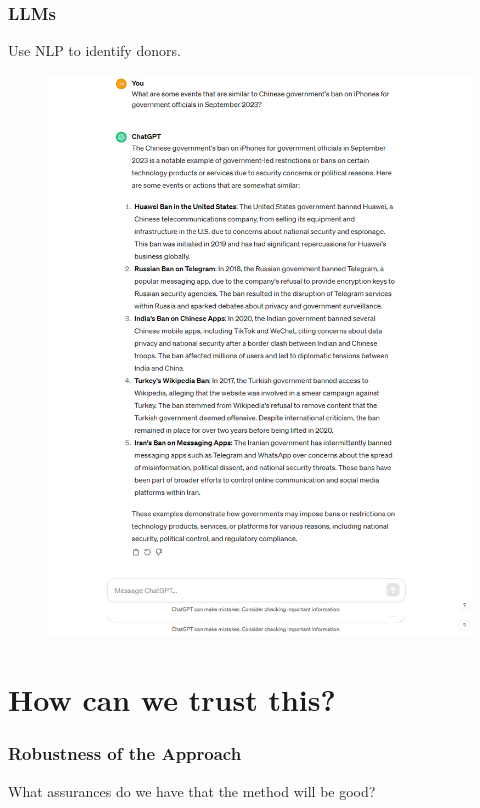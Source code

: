\documentclass[9pt]{beamer}
\theoremstyle{definition}
\begin{document}
\begin{frame}\frametitle{LLMs}
    Use NLP to identify donors.

    \begin{figure}[H]
        \begin{center}
          \includegraphics[scale=.18]{iphone.png}
          \end{center}
        \end{figure}


     
\end{frame}

\section{How can we trust this?}

\begin{frame}\frametitle{Robustness of the Approach}
    What assurances do we have that the method will be good?

    \bigskip

    \end{frame}
\end{document}
